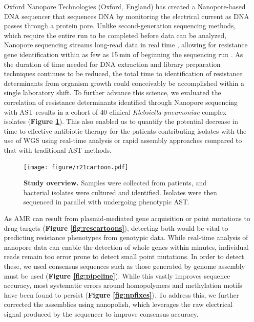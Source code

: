 Oxford Nanopore Technologies (Oxford, England) has created a Nanopore-based DNA sequencer that sequences DNA by monitoring the electrical current as DNA passes through a protein pore. Unlike second-generation sequencing methods, which require the entire run to be completed before data can be analyzed, Nanopore sequencing streams long-read data in real time \citep{Cao2016-oj}, allowing for resistance gene identification within as few as 15 min of beginning the sequencing run \citep{Schmidt2017-ng, Lemon2017-td, Judge2015-zw}. As the duration of time needed for DNA extraction and library preparation techniques continues to be reduced, the total time to identification of resistance determinants from organism growth could conceivably be accomplished within a single laboratory shift. To further advance this science, we evaluated the correlation of resistance determinants identified through Nanopore sequencing with AST results in a cohort of 40 clinical \textit{Klebsiella pneumoniae} complex isolates ({\bf Figure \ref{fig:r21cartoon}}). This also enabled us to quantify the potential decrease in time to effective antibiotic therapy for the patients contributing isolates with the use of WGS using real-time analysis or rapid assembly approaches compared to that with traditional AST methods.



\begin{figure}[!ht]
\centering
\texttt{[image: figure/r21cartoon.pdf]}
\caption[Study overview]{{\bf Study overview.} Samples were collected from patients, and bacterial isolates were cultured and identified. Isolates were then sequenced in parallel with undergoing phenotypic AST. }
\label{fig:r21cartoon}
\end{figure}


As AMR can result from plasmid-mediated gene acquisition or point mutations to drug targets ({\bf Figure \ref{fig:rescartoons}}), detecting both would be vital to predicting resistance phenotypes from genotypic data. While real-time analysis of nanopore data can enable the detection of whole genes within minutes, individual reads remain too error prone to detect small point mutations. In order to detect these, we used consensus sequences such as those generated by genome assembly must be used ({\bf Figure \ref{fig:pipeline}}). While this vastly improves sequence accuracy, most systematic errors around homopolymers and methylation motifs have been found to persist ({\bf Figure \ref{fig:npfixes}}). To address this, we further corrected the assemblies using nanopolish, which leverages the raw electrical signal produced by the sequencer to improve consensus accuracy.

